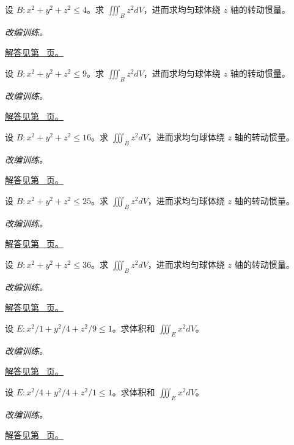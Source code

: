\documentclass[12pt,fontset=fandol]{ctexart}
\begin{document}
\begin{example}[球内坐标平方的积分]\label{ex:c39q8}
设 $B:x^2+y^2+z^2\le 4$。求 $\iiint_Bz^2dV$，进而求均匀球体绕 $z$ 轴的转动惯量。
\par\textit{改编训练。}\par\hyperref[ans:c39q8]{解答见第~\pageref{ans:c39q8} 页。}
\end{example}
\begin{example}[球内坐标平方的积分]\label{ex:c39q9}
设 $B:x^2+y^2+z^2\le 9$。求 $\iiint_Bz^2dV$，进而求均匀球体绕 $z$ 轴的转动惯量。
\par\textit{改编训练。}\par\hyperref[ans:c39q9]{解答见第~\pageref{ans:c39q9} 页。}
\end{example}
\begin{example}[球内坐标平方的积分]\label{ex:c39q10}
设 $B:x^2+y^2+z^2\le 16$。求 $\iiint_Bz^2dV$，进而求均匀球体绕 $z$ 轴的转动惯量。
\par\textit{改编训练。}\par\hyperref[ans:c39q10]{解答见第~\pageref{ans:c39q10} 页。}
\end{example}
\begin{example}[球内坐标平方的积分]\label{ex:c39q11}
设 $B:x^2+y^2+z^2\le 25$。求 $\iiint_Bz^2dV$，进而求均匀球体绕 $z$ 轴的转动惯量。
\par\textit{改编训练。}\par\hyperref[ans:c39q11]{解答见第~\pageref{ans:c39q11} 页。}
\end{example}
\begin{example}[球内坐标平方的积分]\label{ex:c39q12}
设 $B:x^2+y^2+z^2\le 36$。求 $\iiint_Bz^2dV$，进而求均匀球体绕 $z$ 轴的转动惯量。
\par\textit{改编训练。}\par\hyperref[ans:c39q12]{解答见第~\pageref{ans:c39q12} 页。}
\end{example}
\begin{example}[椭球体积与二次矩]\label{ex:c39q13}
设 $E:x^2/1+y^2/4+z^2/9\le1$。求体积和 $\iiint_Ex^2dV$。
\par\textit{改编训练。}\par\hyperref[ans:c39q13]{解答见第~\pageref{ans:c39q13} 页。}
\end{example}
\begin{example}[椭球体积与二次矩]\label{ex:c39q14}
设 $E:x^2/4+y^2/4+z^2/1\le1$。求体积和 $\iiint_Ex^2dV$。
\par\textit{改编训练。}\par\hyperref[ans:c39q14]{解答见第~\pageref{ans:c39q14} 页。}
\end{example}
\end{document}

